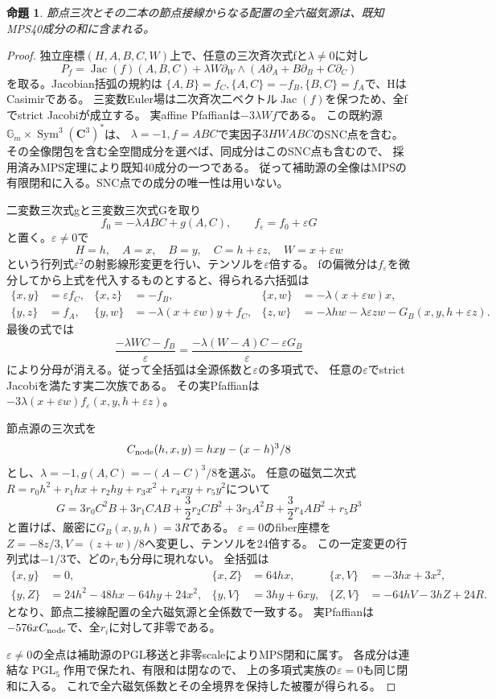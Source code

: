 \documentclass[a4paper,11pt]{ltjsarticle}
\newtheorem{proposition}{命題}[section]
\theoremstyle{definition}
\newcommand{\CC}{\mathbf C}
\newcommand{\PGL}{\operatorname{PGL}}
\begin{document}
\begin{proposition}\label{prop:node-two-tangents-mps}
節点三次とその二本の節点接線からなる配置の全六磁気源は、既知MPS40成分の和に含まれる。
\end{proposition}
\begin{proof}
独立座標$(H,A,B,C,W)$上で、任意の三次斉次式fと$\lambda\ne0$に対し
\[
 P_f=\operatorname{Jac}(f)(A,B,C)
       +\lambda W\partial_W\wedge(A\partial_A+B\partial_B+C\partial_C)
\]
を取る。Jacobian括弧の規約は
$\{A,B\}=f_C,\{A,C\}=-f_B,\{B,C\}=f_A$で、HはCasimirである。
三変数Euler場は二次斉次二ベクトル$\operatorname{Jac}(f)$を保つため、全fでstrict Jacobiが成立する。
実affine Pfaffianは$-3\lambda Wf$である。
この既約源$\mathbb G_m\times\operatorname{Sym}^3(\CC^3)^*$は、
$\lambda=-1,f=ABC$で実因子$3HWABC$のSNC点を含む。
その全像閉包を含む全空間成分を選べば、同成分はこのSNC点も含むので、
採用済みMPS定理により既知40成分の一つである。
従って補助源の全像はMPSの有限閉和に入る。SNC点での成分の唯一性は用いない。

二変数三次式gと三変数三次式Gを取り
\[
 f_0=-\lambda ABC+g(A,C),\qquad f_\varepsilon=f_0+\varepsilon G
\]
と置く。$\varepsilon\ne0$で
\[
 H=h,\quad A=x,\quad B=y,\quad C=h+\varepsilon z,\quad W=x+\varepsilon w
\]
という行列式$\varepsilon^2$の射影線形変更を行い、テンソルを$\varepsilon$倍する。
fの偏微分は$f_\varepsilon$を微分してから上式を代入するものとすると、得られる六括弧は
\[
\begin{aligned}
 \{x,y\}&=\varepsilon f_C,& \{x,z\}&=-f_B,&
 \{x,w\}&=-\lambda(x+\varepsilon w)x,\\
 \{y,z\}&=f_A,& \{y,w\}&=-\lambda(x+\varepsilon w)y+f_C,&
 \{z,w\}&=-\lambda hw-\lambda\varepsilon zw-G_B(x,y,h+\varepsilon z).
\end{aligned}
\]
最後の式では
\[
 \frac{-\lambda WC-f_B}{\varepsilon}
   =\frac{-\lambda(W-A)C-\varepsilon G_B}{\varepsilon}
\]
により分母が消える。従って全括弧は全源係数と$\varepsilon$の多項式で、
任意の$\varepsilon$でstrict Jacobiを満たす実二次族である。
その実Pfaffianは$-3\lambda(x+\varepsilon w)f_\varepsilon(x,y,h+\varepsilon z)$。

節点源の三次式を
\[
 C_{\rm node}(h,x,y)=hxy-(x-h)^3/8
\]
とし、$\lambda=-1,g(A,C)=-(A-C)^3/8$を選ぶ。
任意の磁気二次式
$R=r_0h^2+r_1hx+r_2hy+r_3x^2+r_4xy+r_5y^2$について
\[
 G=3r_0C^2B+3r_1CAB+\frac32r_2CB^2
      +3r_3A^2B+\frac32r_4AB^2+r_5B^3
\]
と置けば、厳密に$G_B(x,y,h)=3R$である。
$\varepsilon=0$のfiber座標を$Z=-8z/3,V=(z+w)/8$へ変更し、テンソルを24倍する。
この一定変更の行列式は$-1/3$で、どの$r_i$も分母に現れない。
全括弧は
\[
\begin{aligned}
 \{x,y\}&=0,& \{x,Z\}&=64hx,& \{x,V\}&=-3hx+3x^2,\\
 \{y,Z\}&=24h^2-48hx-64hy+24x^2,&
 \{y,V\}&=3hy+6xy,&
 \{Z,V\}&=-64hV-3hZ+24R.
\end{aligned}
\]
となり、節点二接線配置の全六磁気源と全係数で一致する。
実Pfaffianは$-576xC_{\rm node}$で、全$r_i$に対して非零である。

$\varepsilon\ne0$の全点は補助源のPGL移送と非零scaleによりMPS閉和に属す。
各成分は連結な$\PGL_5$作用で保たれ、有限和は閉なので、
上の多項式実族の$\varepsilon=0$も同じ閉和に入る。
これで全六磁気係数とその全境界を保持した被覆が得られる。
\end{proof}
\end{document}
